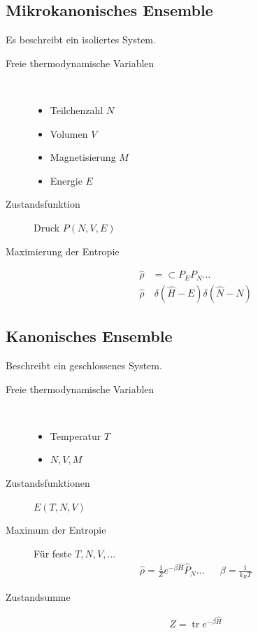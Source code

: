 \documentclass[11pt]{article}
\theoremstyle{plain}
\newcommand{\trace}{\operatorname{tr}}
\begin{document}
\subsection*{Mikrokanonisches Ensemble}
Es beschreibt ein isoliertes System.
\begin{description}
  \item[Freie thermodynamische Variablen] $ $ 
    \begin{itemize}
      \item Teilchenzahl $N$
      \item Volumen $V$
      \item Magnetisierung $M$
      \item Energie $E$
    \end{itemize}
  \item[Zustandsfunktion] Druck $P(N,V,E)$
  \item[Maximierung der Entropie] 
    \begin{align*}
      \hat{\rho} & = \subset P_E P_N \ldots \\
      \hat{\rho} & ~ \delta(\hat{H} - E) \delta (\hat{N} - N)
    \end{align*}
\end{description}
\subsection*{Kanonisches Ensemble}
Beschreibt ein geschlossenes System.
\begin{description}
  \item[Freie thermodynamische Variablen] $ $
    \begin{itemize}
      \item Temperatur $T$
      \item $N, V, M$
    \end{itemize}
  \item[Zustandsfunktionen] $E(T, N, V)$
  \item [Maximum der Entropie] 
    F\"ur feste $T, N, V, \ldots$
    \begin{align*}
      \hat{\rho} = \frac{1}{Z} e^{- \beta \hat{H} } \hat{P}_N \ldots && 
      \beta = \frac{1}{k_B T}
    \end{align*}
  \item[Zustandsumme]
    \begin{align*}
      Z= \trace e^{- \beta \hat{H}}
    \end{align*}
\end{description}
\end{document}
